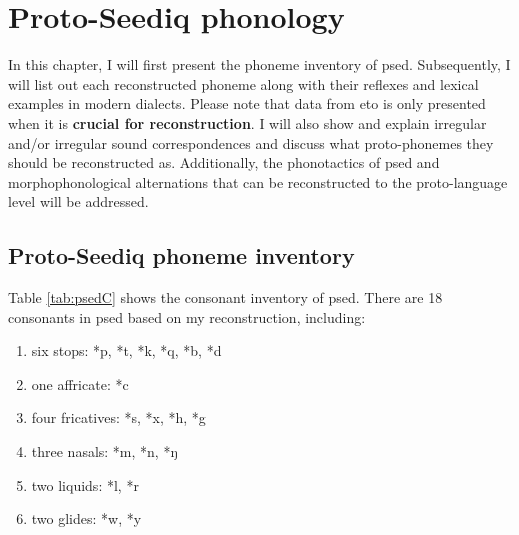 \chapter{Proto-Seediq phonology}\label{ch4}

In this chapter, I will first present the phoneme inventory of \acl{psed}. Subsequently, I will list out each reconstructed phoneme along with their reflexes and lexical examples in modern dialects. Please note that data from \acl{eto} is only presented when it is \textbf{crucial for reconstruction}. I will also show and explain irregular and/or irregular sound correspondences and discuss what proto-phonemes they should be reconstructed as. Additionally, the phonotactics of \acl{psed} and morphophonological alternations that can be reconstructed to the proto-language level will be addressed.

\section{Proto-Seediq phoneme inventory}

Table \ref{tab:psedC} shows the consonant inventory of \acl{psed}. There are 18 consonants in \acl{psed} based on my reconstruction, including:

\begin{enumerate}[label=(\roman*), itemsep=0pt, topsep=0pt]
    \item six stops: *p, *t, *k, *q, *b, *d
    \item one affricate: *c
    \item four fricatives: *s, *x, *h, *g
    \item three nasals: *m, *n, *ŋ
    \item two liquids: *l, *r
    \item two glides: *w, *y
\end{enumerate}


